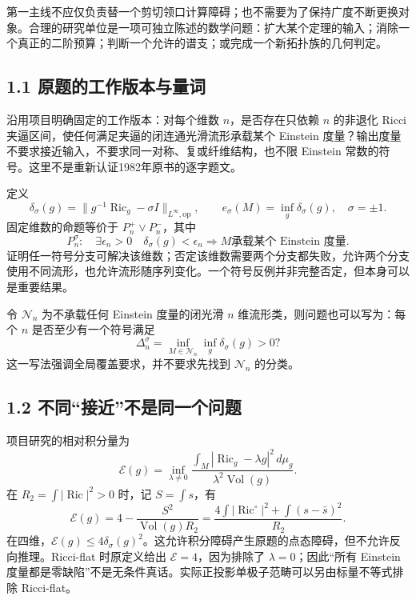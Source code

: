 \documentclass[
  11pt,
  a4paper,
  fontset=none]{ctexart}
\begin{document}
第一主线不应仅负责替一个剪切领口计算障碍；也不需要为了保持广度不断更换对象。合理的研究单位是一项可独立陈述的数学问题：扩大某个定理的输入；消除一个真正的二阶预算；判断一个允许的谱支；或完成一个新拓扑族的几何判定。

\subsection{1.1
原题的工作版本与量词}\label{ux539fux9898ux7684ux5de5ux4f5cux7248ux672cux4e0eux91cfux8bcd}

沿用项目明确固定的工作版本：对每个维数 \(n\)，是否存在只依赖 \(n\)
的非退化 Ricci 夹逼区间，使任何满足夹逼的闭连通光滑流形承载某个 Einstein
度量？输出度量不要求接近输入，不要求同一对称、复或纤维结构，也不限
Einstein 常数的符号。这里不是重新认证1982年原书的逐字题文。

定义 \[
\delta_\sigma(g)=\|g^{-1}\operatorname{Ric}_g-\sigma I\|_{L^\infty,\mathrm{op}},
\qquad e_\sigma(M)=\inf_g\delta_\sigma(g),\quad\sigma=\pm1.
\] 固定维数的命题等价于 \(P_n^+\lor P_n^-\)，其中 \[
P_n^\sigma:\quad\exists\epsilon_n>0\quad
\delta_\sigma(g)<\epsilon_n\Longrightarrow
M\text{承载某个 Einstein 度量}.
\]
证明任一符号分支可解决该维数；否定该维数需要两个分支都失败，允许两个分支使用不同流形，也允许流形随序列变化。一个符号反例并非完整否定，但本身可以是重要结果。

令 \(\mathcal N_n\) 为不承载任何 Einstein 度量的闭光滑 \(n\)
维流形类，则问题也可以写为：每个 \(n\) 是否至少有一个符号满足 \[
\Delta_n^\sigma=
\inf_{M\in\mathcal N_n}\inf_g\delta_\sigma(g)>0?
\] 这一写法强调全局覆盖要求，并不要求先找到 \(\mathcal N_n\) 的分类。

\subsection{1.2
不同``接近''不是同一个问题}\label{ux4e0dux540cux63a5ux8fd1ux4e0dux662fux540cux4e00ux4e2aux95eeux9898}

项目研究的相对积分量为 \[
\mathcal E(g)=\inf_{\lambda\ne0}
\frac{\int_M|\operatorname{Ric}_g-\lambda g|^2\,d\mu_g}
{\lambda^2\operatorname{Vol}(g)}.
\] 在 \(R_2=\int|\operatorname{Ric}|^2>0\) 时，记 \(S=\int s\)，有 \[
\mathcal E(g)=4-\frac{S^2}{\operatorname{Vol}(g)R_2}
=\frac{4\int|\operatorname{Ric}^{\circ}|^2+\int(s-\bar s)^2}{R_2}.
\]
在四维，\(\mathcal E(g)\le4\delta_\sigma(g)^2\)。这允许积分障碍产生原题的点态障碍，但不允许反向推理。Ricci-flat
时原定义给出 \(\mathcal E=4\)，因为排除了 \(\lambda=0\)；因此``所有
Einstein
度量都是零缺陷''不是无条件真话。实际正投影单极子范畴可以另由标量不等式排除
Ricci-flat。
\end{document}
